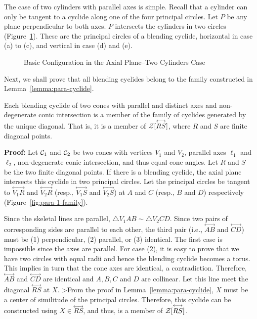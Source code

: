      The case of two cylinders with parallel axes is simple.
Recall that a cylinder can only be tangent to a cyclide along
one of the four principal circles.  Let $P$ be any plane perpendicular to
both axes.  $P$ intersects the cylinders in two circles
(Figure~\ref{fig:para-cy-cyclide}).  These are the
principal circles of a blending cyclide, horizontal in case (a) to (c), and
vertical in case (d) and (e).  \QED
\begin{figure}
\vspace{3cm}
\caption{Basic Configuration in the Axial Plane--Two Cylinders Case}
\label{fig:para-cy-cyclide}
\end{figure}

     Next, we shall prove that all blending cyclides belong to the 
family constructed in Lemma~\ref{lemma:para-cyclide}.

\begin{lemma}
\label{lemma:para-1-family}
     Each blending cyclide of two cones with parallel and distinct axes and 
non-degenerate conic intersection is a member of the family of cyclides
generated by the unique diagonal.  That is, it is a member of 
${\cal Z}[\stackrel{\longleftrightarrow}{RS}]$, where $R$ and $S$ are 
finite diagonal points.
\end{lemma}
{\bf Proof:}  Let ${\cal C}_1$ and ${\cal C}_2$ be two cones with 
vertices $V_1$ and $V_2$, parallel axes $\ell_1$ and $\ell_2$,
non-degenerate conic intersection, and thus
equal cone angles.  Let $R$ and $S$ be the
two finite diagonal points.
If there is a blending cyclide, the axial plane intersects
this cyclide in two principal circles.  
Let the principal circles be tangent to 
$\stackrel{\longleftrightarrow}{V_1R}$ and
$\stackrel{\longleftrightarrow}{V_2R}$ (resp.,
$\stackrel{\longleftrightarrow}{V_1S}$ and
$\stackrel{\longleftrightarrow}{V_2S}$) at $A$ and $C$ (resp., $B$ and $D$)
respectively (Figure~\ref{fig:para-1-family}).

     Since the skeletal lines are parallel, 
$\bigtriangleup V_1AB\sim\bigtriangleup V_2CD$.  Since two 
pairs of corresponding sides are parallel to each other, the third pair
(i.e., $\stackrel{\longleftrightarrow}{AB}$ and
$\stackrel{\longleftrightarrow}{CD}$) must be (1) perpendicular, (2) parallel,
or (3) identical.  The first case is impossible since the axes are parallel.  
For case (2),
it is easy to prove that we have two circles with equal radii and hence the
blending cyclide becomes a torus.  This implies in turn that the cone
axes are identical, a contradiction.  Therefore, 
$\stackrel{\longleftrightarrow}{AB}$ and $\stackrel{\longleftrightarrow}{CD}$
are identical and $A,B,C$ and $D$ are collinear.  Let this line meet the 
diagonal $\stackrel{\longleftrightarrow}{RS}$ at $X$.  
>From the proof in Lemma~\ref{lemma:para-cyclide}, $X$ must be a center of
similitude of the principal circles.  Therefore, this
cyclide can be constructed using $X\in\stackrel{\longleftrightarrow}{RS}$,
and thus, is a member of ${\cal Z}[\stackrel{\longleftrightarrow}{RS}]$. \QED

